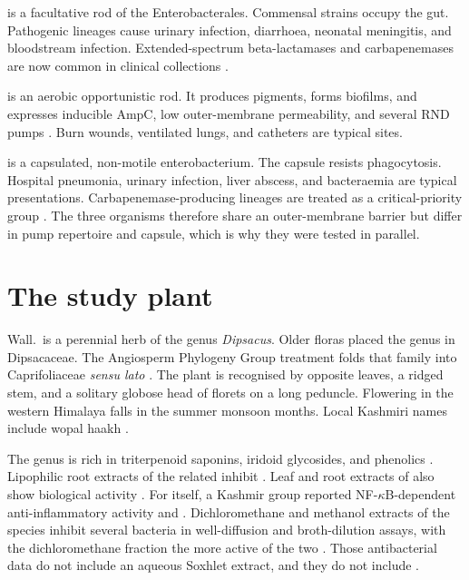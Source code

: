  is a facultative rod of the Enterobacterales. Commensal strains occupy the gut. Pathogenic lineages cause urinary infection, diarrhoea, neonatal meningitis, and bloodstream infection. Extended-spectrum beta-lactamases and carbapenemases are now common in clinical collections \citep{amrcollaborators2022global}.

 is an aerobic opportunistic rod. It produces pigments, forms biofilms, and expresses inducible AmpC, low outer-membrane permeability, and several RND pumps \citep{hancock2000antibiotic,poole2005efflux}. Burn wounds, ventilated lungs, and catheters are typical sites.

 is a capsulated, non-motile enterobacterium. The capsule resists phagocytosis. Hospital pneumonia, urinary infection, liver abscess, and bacteraemia are typical presentations. Carbapenemase-producing lineages are treated as a critical-priority group \citep{who2024bacterial}. The three organisms therefore share an outer-membrane barrier but differ in pump repertoire and capsule, which is why they were tested in parallel.

\section{The study plant}

 Wall.\ is a perennial herb of the genus \textit{Dipsacus}. Older floras placed the genus in Dipsacaceae. The Angiosperm Phylogeny Group treatment folds that family into Caprifoliaceae \textit{sensu lato} \citep{apgiv2016,skala2023dipsacus}. The plant is recognised by opposite leaves, a ridged stem, and a solitary globose head of florets on a long peduncle. Flowering in the western Himalaya falls in the summer monsoon months. Local Kashmiri names include wopal haakh \citep{skala2023dipsacus,lone2015study}.

The genus is rich in triterpenoid saponins, iridoid glycosides, and phenolics \citep{zhao2011phytochemicals,skala2023dipsacus}. Lipophilic root extracts of the related  inhibit  \invitro{} \citep{liebold2011growth}. Leaf and root extracts of  also show biological activity \citep{oszmianski2020roots}. For  itself, a Kashmir group reported NF-$\kappa$B-dependent anti-inflammatory activity \invitro{} and \invivo{} \citep{hassan2020dipsacus}. Dichloromethane and methanol extracts of the species inhibit several bacteria in well-diffusion and broth-dilution assays, with the dichloromethane fraction the more active of the two \citep{drakhshaan2026identification}. Those antibacterial data do not include an aqueous Soxhlet extract, and they do not include .

